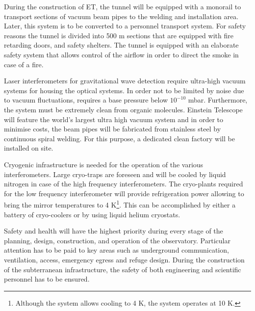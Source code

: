 During the construction of ET, the tunnel will be equipped with a monorail to transport sections of vacuum beam pipes to the welding and installation area. Later, this system is to be converted to a personnel transport system. For safety reasons the tunnel is divided into 500 m sections that are equipped with fire retarding doors, and safety shelters. The tunnel is equipped with an elaborate safety system that allows control of the airflow in order to direct the smoke in case of a fire.

Laser interferometers for gravitational wave detection require ultra-high vacuum systems for housing the optical systems. In order not to be limited by noise due to vacuum fluctuations, requires a base pressure below $10^{-10}$ mbar. Furthermore, the system must be extremely clean from organic molecules. Einstein Telescope will feature the world's largest ultra high vacuum system and in order to minimise costs, the beam pipes will be fabricated from stainless steel by continuous spiral welding. For this purpose, a dedicated clean factory will be installed on site.

Cryogenic infrastructure is needed for the operation of the various interferometers. Large cryo-traps are foreseen and will be cooled by liquid nitrogen in case of the high frequency interferometers. The cryo-plants required for the low frequency interferometer will provide refrigeration power allowing to bring the mirror temperatures to 4 K\footnote{Although the system allows cooling to 4 K, the system operates at 10 K.}. This can be accomplished by either a battery of cryo-coolers or by using liquid helium cryostats.

Safety and health will have the highest priority during every stage of the planning, design, construction, and operation of the observatory. Particular attention has to be paid to key areas such as underground communication, ventilation, access, emergency egress and refuge design. During the construction of the subterranean infrastructure, the safety of both engineering and scientific personnel has to be ensured. 

